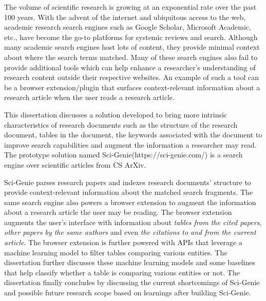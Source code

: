 The volume of scientific research is growing at an exponential rate over the past 100 years. 
With the advent of the internet and ubiquitous access to the web, academic research search engines such as Google Scholar, Microsoft Academic, etc., have become the go-to platforms for systemic reviews and search.  Although many academic search engines host lots of content, they provide minimal context about where the search terms matched. 
Many of these search engines also fail to provide additional tools which can help enhance a researcher's understanding of research content outside their respective websites.
An example of such a tool can be a browser extension/plugin that surfaces context-relevant information about a research article when the user reads a research article.   

This dissertation discusses a solution developed to bring more intrinsic characteristics of research documents such as the structure of the research document, tables in the document,  the keywords associated with the document to improve search capabilities and augment the information a researcher may read.  The prototype solution named Sci-Genie(https://sci-genie.com/) is a search engine over scientific articles from CS ArXiv.

Sci-Genie parses research papers and indexes research documents’ structure to provide context-relevant information about the matched search fragments. The same search engine also powers a browser extension to augment the information about a research article the user may be reading. The browser extension augments the user's interface with information about \textit{tables from the cited papers}, \textit{other papers by the same authors} and even \textit{the citations to and from the current article}. The browser extension is further powered with APIs that leverage a machine learning model to filter tables comparing various entities. 
The dissertation further discusses these machine learning models and some baselines that help classify whether a table is comparing various entities or not.  
The dissertation finally concludes by discussing the current shortcomings of Sci-Genie and possible future research scope based on learnings after building Sci-Genie.
